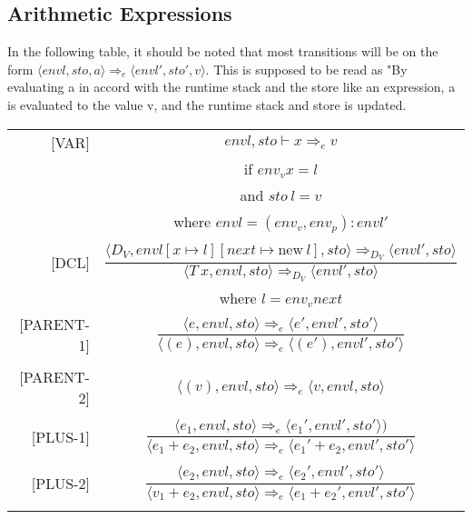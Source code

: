 \subsection{Arithmetic Expressions}
In the following table, it should be noted that most transitions will be on the form \( \langle envl, sto, a \rangle \Rightarrow_e \langle envl', sto', v \rangle \). This is supposed to be read as "By evaluating a in accord with the runtime stack and the store like an expression, a is evaluated to the value v, and the runtime stack and store is updated.
\newline
\begin{longtable}[c] { r c }
  \centering
  
  [VAR] & \( envl, sto \vdash x \Rightarrow_e v \) \\
  & if \(env_v x = l \) \\
  & and \(sto \ l = v \) \\
  & where \(envl = (env_v, env_p) : envl' \) \\
  &  \\

  [DCL] & \( 
    \dfrac{ \langle D_V, envl[x \mapsto l][next \mapsto \text{new} \ l], sto \rangle \Rightarrow_{D_V} \langle envl', sto \rangle}
    { \langle T\ x, envl, sto \rangle \Rightarrow_{D_V} \langle envl', sto \rangle } \) \\
    & where \( l = env_v next \)
  & \\

  [PARENT-1] & 
    \( \dfrac { \langle e, envl, sto \rangle \Rightarrow_e \langle e', envl', sto' \rangle }
      { \langle (e), envl, sto \rangle  \Rightarrow_e \langle (e'), envl', sto' \rangle } \) \\
  & \\

  [PARENT-2] & 
    \( \langle (v), envl, sto \rangle \Rightarrow_e \langle v, envl, sto \rangle \) \\
  & \\

  [PLUS-1] & 
    \( \dfrac { \langle e_1, envl, sto \rangle \Rightarrow_e \langle e_1', envl', sto' \rangle )}
      {\langle e_1 + e_2, envl, sto \rangle \Rightarrow_e \langle e_1' + e_2, envl', sto' \rangle } \) \\
  & \\

  [PLUS-2] & 
    \( \dfrac { \langle e_2, envl, sto \rangle \Rightarrow_e \langle e_2', envl', sto' \rangle }
      {\langle v_1 + e_2, envl, sto \rangle  \Rightarrow_e \langle e_1 + e_2', envl', sto' \rangle } \) \\
  & \\


\end{longtable}

